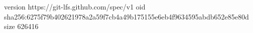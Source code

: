version https://git-lfs.github.com/spec/v1
oid sha256:6275f79b402621978a2a59f7cb4a49b175155e6eb4f9634595abdb652e85e80d
size 626416

